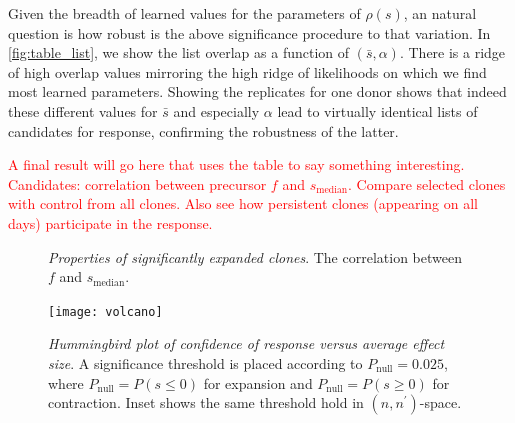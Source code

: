 \documentclass[letterpaper,english,prl,reprint,longbibliography]{revtex4-1} %
\newcommand{\re}[1]{\textcolor{red}{#1}}
\begin{document}
Given the breadth of learned values for the parameters of $\rho(s)$, an natural question is how robust is the above significance procedure to that variation. In \cref{fig:table_list}, we show the list overlap as a function of $(\bar{s}, \alpha)$. There is a ridge of high overlap values mirroring the high ridge of likelihoods on which we find most learned parameters. Showing the replicates for one donor shows that indeed these different values for $\bar{s}$ and especially $\alpha$ lead to virtually identical lists of candidates for response, confirming the robustness of the latter.

\re{A final result will go here that uses the table to say something interesting. Candidates: correlation between precursor $f$ and $s_{\textrm{median}}$. Compare selected clones with control from all clones. Also see how persistent clones (appearing on all days) participate in the response.}

\begin{figure}[tbph!]
\caption{
\emph{Properties of significantly expanded clones}. The correlation between $f$ and $s_\textrm{median}$.
\label{fig:exp_prop}}
\end{figure}

\begin{figure}[tbph!]
\texttt{[image: volcano]}
\centering{}
\caption{
\emph{Hummingbird plot of confidence of response versus average effect size}. A significance threshold is placed according to $P_{\textrm{null}}=0.025$, where $P_{\textrm{null}}=P(s\leq 0)$ for expansion and $P_{\textrm{null}}=P(s\geq 0)$ for contraction. Inset shows the same threshold hold in $(n,n^\prime)$-space.
\label{fig:volcano}}
\end{figure}
\end{document}
